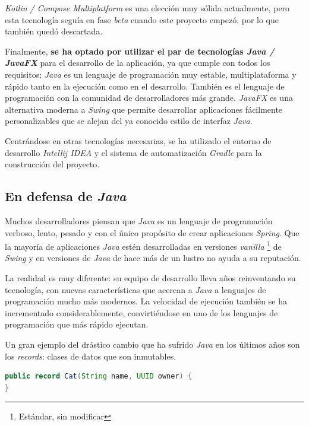 \textit{Kotlin / Compose Multiplatform} es una elección muy sólida actualmente, pero esta
tecnología seguía en fase \textit{beta} cuando este proyecto empezó, por lo que también quedó
descartada.

Finalmente, \textbf{se ha optado por utilizar el par de tecnologías \textit{Java / JavaFX}}
para el desarrollo de la aplicación, ya que cumple con todos los requisitos: \textit{Java} es un
lenguaje de programación muy estable, multiplataforma y rápido tanto en la ejecución como en
el desarrollo.
También es el lenguaje de programación con la comunidad de desarrolladores más grande.
\textit{JavaFX} es una alternativa moderna a \textit{Swing} que permite desarrollar aplicaciones
fácilmente personalizables que se alejan del ya conocido estilo de interfaz \textit{Java}.

Centrándose en otras tecnologías necesarias, se ha utilizado el entorno de desarrollo
\textit{Intellij IDEA}\cite{INTELLIJIDEA} y el sistema de
automatización \textit{Gradle} para la construcción del proyecto.

\subsection{En defensa de \textit{Java}}\label{subsec:en-defensa-de-java}

Muchos desarrolladores piensan que \textit{Java} es un lenguaje de programación verboso, lento, pesado
y con el único propósito de crear aplicaciones \textit{Spring}.
Que la mayoría de aplicaciones \textit{Java} estén desarrolladas en versiones \textit{vanilla}
\footnote{Estándar, sin modificar} de \textit{Swing} y en versiones de \textit{Java} de hace más
de un lustro no ayuda a su reputación.

La realidad es muy diferente: su equipo de desarrollo lleva años reinventando su tecnología,
con nuevas características que acercan a \textit{Java} a lenguajes de programación mucho más modernos.
La velocidad de ejecución también se ha incrementado considerablemente, convirtiéndose en uno de los
lenguajes de programación que más rápido ejecutan.

Un gran ejemplo del drástico cambio que ha sufrido \textit{Java} en los últimos años son los
\textit{records}: clases de datos que son inmutables.

\begin{lstlisting}[language=Java,style=java,frame=single,label={lst:java-comparacion-18}]
public record Cat(String name, UUID owner) {
}
\end{lstlisting}

